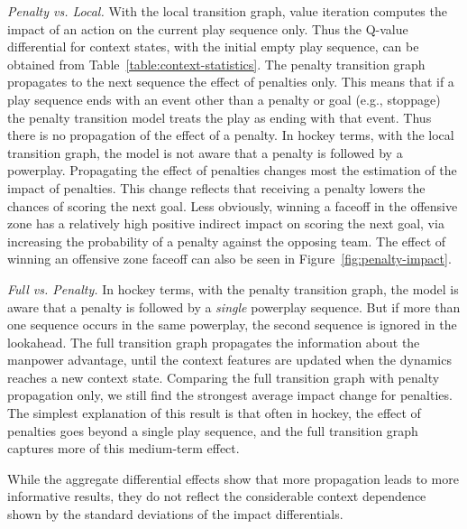 \documentclass[]{article}
\begin{document}
{\em Penalty vs. Local.}
With the local transition graph, value iteration computes the impact of an action on the current play sequence only.
Thus the Q-value differential for context states, with the initial empty play sequence, can be obtained from Table~\ref{table:context-statistics}.
The penalty transition graph propagates to the next sequence the effect of penalties only. This means that if a play sequence ends with an event other than a penalty or goal (e.g., stoppage) the penalty transition model treats the play as ending with that event. Thus there is no propagation of the effect of a penalty. In hockey terms, with the local transition graph, the model is not aware that a penalty is followed by a powerplay.
Propagating the effect of penalties changes most the estimation of the impact of penalties.
This change reflects that receiving a penalty lowers the chances of scoring the next goal.
Less obviously, winning a faceoff in the offensive zone has a relatively high positive indirect impact on scoring the next goal, via increasing the probability of a penalty against the opposing team.
The effect of winning an offensive zone faceoff can also be seen in Figure~\ref{fig:penalty-impact}.

{\em Full vs. Penalty.} In hockey terms, with the penalty transition graph, the model is aware that a penalty is followed by a {\em single} powerplay sequence. But if more than one sequence occurs in the same powerplay, the second sequence is ignored in the lookahead. The full transition graph propagates the information about the manpower advantage, until the context features are updated when the dynamics reaches a new context state.
Comparing the full transition graph with penalty propagation only, we still find the strongest average impact change for penalties. The simplest explanation of this result is that often in hockey, the effect of penalties goes beyond a single play sequence, and the full transition graph captures more of this medium-term effect.

While the aggregate differential effects show that more propagation leads to more informative results, they do not reflect the considerable context dependence shown by the standard deviations of the impact differentials.
\end{document}
